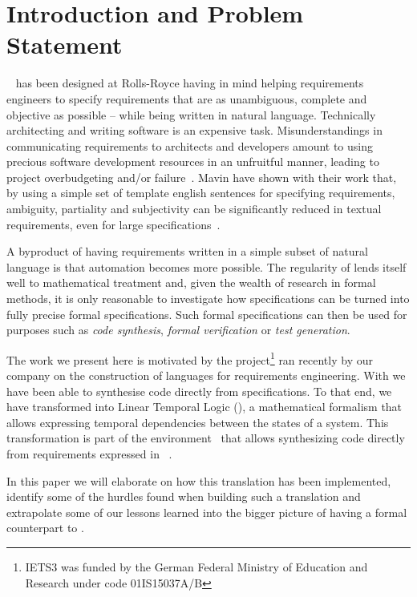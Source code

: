\section{Introduction and Problem Statement}

\ears~\cite{EARS09} has been designed at Rolls-Royce having in mind helping
requirements engineers to specify requirements that are as unambiguous, complete
and objective as possible -- while being written in natural language.
Technically architecting and writing software is an expensive task.
Misunderstandings in communicating requirements to architects and developers
amount to using precious software development resources in an unfruitful manner,
leading to project overbudgeting and/or failure~\cite{chaos:2014}. Mavin \etal
have shown with their work that, by using a simple set of template english
sentences for specifying requirements, ambiguity, partiality and subjectivity
can be significantly reduced in textual requirements, even for large
specifications~\cite{EARS10,EARS16}.

A byproduct of having requirements written in a simple subset of natural
language is that automation becomes more possible. The regularity of \ears lends
itself well to mathematical treatment and, given the wealth of research in
formal methods, it is only reasonable to investigate how \ears specifications
can be turned into fully precise formal specifications. Such formal
specifications can then be used for purposes such as \emph{code synthesis},
\emph{formal verification} or \emph{test generation}.

The work we present here is motivated by the \iets project\footnote{IETS3 was
funded by the German Federal Ministry of Education and Research under code
01IS15037A/B} ran recently by our company on the construction of languages for
requirements engineering. With \iets we have been able to synthesise code
directly from \ears specifications. To that end, we have transformed \ears into
Linear Temporal Logic (\ltl), a mathematical formalism that allows expressing
temporal dependencies between the states of a system. This transformation is
part of the \earsctrl environment~\cite{earsctrlProcess} that allows
synthesizing code directly from requirements expressed in
\ears~\cite{LucioRCA16,LucioRAM17}.

In this paper we will elaborate on how this translation has been implemented,
identify some of the hurdles found when building such a translation and
extrapolate some of our lessons learned into the bigger picture of having a
formal counterpart to \ears.